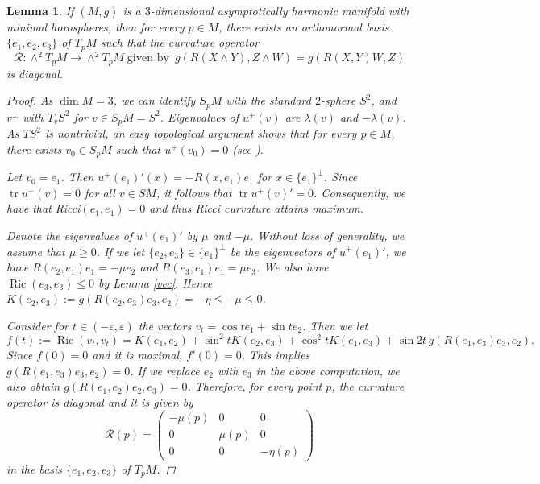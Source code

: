 \documentclass[12pt,a4paper]{amsart}
\newtheorem{Lem}[Thm]{Lemma}
\theoremstyle{definition}
\theoremstyle{remark}
\newcommand{\la}{\lambda}
\newcommand{\Ric}{\operatorname{Ric}}
\newcommand{\tr}{\operatorname{tr}}
\renewcommand{\cos}{\operatorname{cos}}
\newcommand \<{\langle}
\renewcommand \>{\rangle}
\begin{document}
\begin{Lem}\label{lem:curvdiag}
    If $(M,g)$ is a $3$-dimensional asymptotically harmonic manifold with minimal horospheres, then for every $p\in M$, there exists an orthonormal basis $\{e_1,e_2,e_3\}$ of $T_p M$ such that the curvature operator
    \begin{equation*}
        \mathcal{R}:\wedge^2 T_pM \to \wedge^2 T_p M \;{\textrm{given by}}\;\ g(R(X\wedge Y),Z\wedge W) = g(R(X,Y)W,Z)
    \end{equation*}
    is diagonal.
    \begin{proof}
    As $\dim M =3$, we can identify $S_p M$ with the standard $2$-sphere ${S}^2$, and $v^\perp$ with $T_v S^2$ for $v\in S_p M = {S}^2$. Eigenvalues of  $u^{+}(v)$ are  $\la(v)$ and $-\la(v)$.  As $TS^2$ is nontrivial,  an easy
  topological argument shows that for every $p\in M$, there exists $v_0 \in S_p M$ such that $u^{+}(v_0 ) =0$ (see \cite[p. 848]{H}).

    Let $v_0 = e_1$. Then $u^{+}(e_1)'(x) = -R(x,e_1)e_1$ for $x\in \{e_1\}^\perp$. Since  $\tr u^{+}(v) = 0$ for all $v \in SM$, it follows that  $\tr u^{+}(v)' =0$. {Consequently, we have that Ricci$(e_1, e_1) = 0$  and
 thus {\it Ricci curvature attains maximum}. }

   Denote the eigenvalues of $u^{+}(e_1)'$ by $\mu$ and $-\mu$. Without loss of generality, we assume that $\mu \ge 0$.
    If we let $\{e_2, e_3\}\in \{e_1\}^\perp$ be the eigenvectors of $u^{+}(e_1)'$, we have $R(e_2,e_1)e_1 = -\mu e_2$ and $R(e_3,e_1)e_1 = \mu e_3$. We also have  $\Ric(e_3,e_3)\le 0$ by Lemma \ref{vec}. Hence $K(e_2,e_3):=g(R(e_2,e_3)e_3,e_2)= - \eta \le -\mu \leq 0$.

    Consider for $t\in (-\varepsilon,\varepsilon)$ the vectors $v_t=\cos te_1 + \sin te_2$. Then we let
    \begin{equation*}
        f(t):=\Ric(v_t,v_t)=K(e_1,e_2)+\sin^2 t K(e_2,e_3) + \cos^2 t K(e_1,e_3) + \sin 2t\, g(R(e_1,e_3)e_3,e_2).
    \end{equation*}
    Since $f(0)=0$ and it is maximal, $f'(0)=0$. This implies $g(R(e_1,e_3)e_3,e_2)=0$. If we replace $e_2$ with $e_3$ in the above computation, we also obtain  $g(R(e_1,e_2)e_2,e_3)=0$. Therefore, for every point $p$, the curvature operator is diagonal and it is given by
    \begin{equation*}
        {\mathcal{R}}(p) =
        \begin{pmatrix}
           - \mu(p) & 0 & 0\\
            0 & \mu(p) & 0\\
            0 & 0 & { -\eta(p)}
        \end{pmatrix}
    \end{equation*}
    in the basis $\{e_1,e_2,e_3\}$ of $T_p M$.
  \end{proof}
\end{Lem}
\end{document}
